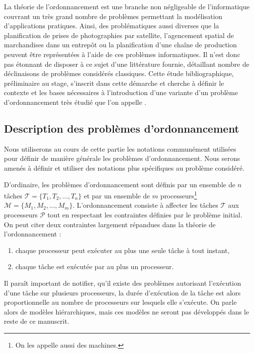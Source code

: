 La théorie de l'ordonnancement est une branche non négligeable de l'informatique couvrant un très
grand nombre de problèmes permettant la modélisation d'applications pratiques. Ainsi, des
problématiques aussi diverses que la planification de prises de photographies par satellite,
l'agencement spatial de marchandises dans un entrepôt ou la planification d'une chaîne de production
peuvent être représentées à l'aide de ces problèmes informatiques. Il n'est donc pas étonnant de
disposer à ce sujet d'une littérature fournie, détaillant nombre de déclinaisons de problèmes
considérés classiques. Cette étude bibliographique, préliminaire au stage, s'inscrit dans cette
démarche et cherche à définir le contexte et les bases nécessaires à l'introduction d'une variante
d'un problème d'ordonnancement très étudié que l'on appelle \isched.

\subsection{Description des problèmes d'ordonnancement}

Nous utiliserons au cours de cette partie les notations communément utilisées pour définir de
manière générale les problèmes d'ordonnancement. Nous serons amenés à définir et utiliser des
notations plus spécifiques au problème considéré.

D'ordinaire, les problèmes d'ordonnancement sont définis par un ensemble de $n$ tâches $\mathcal{T} =
\{T_1, T_2, \dots, T_n\}$ et par un ensemble de $m$ processeurs\footnote{On les appelle aussi des
machines.} $\mathcal{M} = \{M_1, M_2, \dots, M_m\}$. L'ordonnancement consiste à affecter les
tâches $\mathcal{T}$ aux processeurs $\mathcal{P}$ tout en respectant les contraintes définies par
le problème initial. On peut citer deux contraintes largement répandues dans la théorie de
l'ordonnancement :
\begin{enumerate}
    \item chaque processeur peut exécuter au plus une seule tâche à tout instant,
    \item chaque tâche est exécutée par au plus un processeur.
\end{enumerate}

Il paraît important de notifier, qu'il existe des problèmes autorisant l'exécution d'une tâche sur
plusieurs processeurs, la durée d'exécution de la tâche est alors proportionnelle au nombre de
processeurs sur lesquels elle s'exécute. On parle alors de modèles hiérarchiques, mais ces modèles
ne seront pas développés dans le reste de ce manuscrit.


